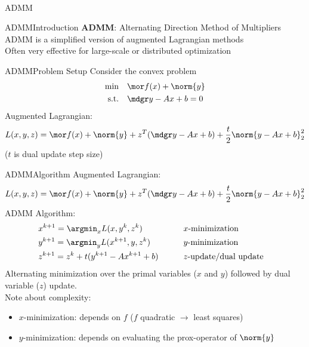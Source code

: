     

\begin{frame}{~}
    \begin{center}
        \LARGE{ADMM}
    \end{center}
\end{frame}{}

\begin{frame}{ADMM}{Introduction}
    \textbf{ADMM}: Alternating Direction Method of Multipliers \\
    \bigskip
    ADMM is a simplified version of augmented Lagrangian methods \\
    \bigskip
    Often very effective for large-scale or distributed optimization
\end{frame}{}

\begin{frame}{ADMM}{Problem Setup}
    Consider the convex problem
    \begin{align}
        \min \quad & {\mor f(x) + \norm{y}} \nonumber \\
        \text{s.t.} \quad & {\mdgr y - Ax + b = 0} \nonumber 
    \end{align}
    Augmented Lagrangian:
    \begin{align*}
        L(x,y,z) = {\mor f(x) + \norm{y}} + z^T({\mdgr y - Ax + b}) + \frac{t}{2} \norm{y-Ax+b}_2^2
    \end{align*}
    ($t$ is dual update step size)
\end{frame}{}

\begin{frame}{ADMM}{Algorithm}
    Augmented Lagrangian:
    \begin{align*}
        L(x,y,z) = {\mor f(x) + \norm{y}} + z^T({\mdgr y - Ax + b}) + \frac{t}{2} \norm{y-Ax+b}_2^2
    \end{align*}
    ADMM Algorithm:
    \begin{align*}
        &x^{k+1} = \argmin_x L(x,y^k,z^k)& &\quad& &\text{$x$-minimization}& \\
        &y^{k+1} = \argmin_y L(x^{k+1},y,z^k)& &\quad& &\text{$y$-minimization}& \\
        &z^{k+1} = z^k + t(y^{k+1}-Ax^{k+1}+b)& &\quad& &\text{$z$-update/dual update}&
    \end{align*}
    Alternating minimization over the primal variables ($x$ and $y$) followed by dual variable ($z$) update. \\
    \pause
    \bigskip
    Note about complexity:
    \begin{itemize}
        \item $x$-minimization: depends on $f$ ($f$ quadratic $\rightarrow$ least squares)
        \item $y$-minimization: depends on evaluating the prox-operator of $\norm{y}$
    \end{itemize}
\end{frame}{}

